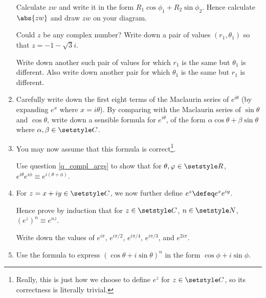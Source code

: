 \begin{enumerate}
  Calculate \(zw\) and write it in the form
  \(R_1 \cos \phi_1 + R_2 \sin \phi_2\). Hence calculate \(\abs{zw}\) and draw
  \(zw\) on your diagram.

  Could \(z\) be any complex number? Write down a pair of values
  \((r_1, \theta_1)\) so that \(z = -1 - \sqrt 3i\).

  Write down another such pair of values for which \(r_1\) is the same but
  \(\theta_1\) is different. Also write down another pair for which
  \(\theta_1\) is the same but \(r_1\) is different.
 \item
  Carefully write down the first eight terms of the Maclaurin series of
  \(e^{i\theta}\) (by expanding \(e^x\) where \(x = i\theta\)). By comparing
  with the Maclaurin series of \(\sin \theta\) and \(\cos \theta\), write down a
  sensible formula for \(e^{i\theta}\), of the form
  \(\alpha \cos \theta + \beta \sin \theta\) where
  \(\alpha, \beta \in \Complex\).
 \item
  You may now assume that this formula is correct\footnote{
   Really, this is just how we choose to define \(e^z\) for \(z \in \Complex\),
   so its correctness is literally trivial.
  }.

  Use question \ref{q_compl_args} to show that for \(\theta, \phi \in \Reals\),
  \(e^{i\theta} e^{i\phi} \equiv e^{i(\theta + \phi)}\).
 \item
  For \(z = x + iy \in \Complex\), we now further define
  \(e^z \defeq e^x e^{iy}\).

  Hence prove by induction that for \(z \in \Complex\), \(n \in \Naturals\),
  \((e^z)^n \equiv e^{nz}\).

  Write down the values of \(e^{i\pi}\), \(e^{i\pi / 2}\),
  \(e^{i\pi / 4}\), \(e^{i\pi / 3}\), and \(e^{2 i \pi}\).
 \item
  Use the formula to express
  \((\cos \theta + i \sin \theta)^n\) in the form \(\cos \phi + i \sin \phi\).


\end{enumerate}
